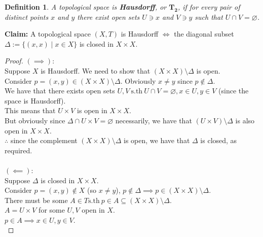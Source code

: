\documentclass{article}
\newcommand{\sth}{\mathrm{s.th}\ }
\renewcommand{\emptyset}{\varnothing}
\newtheorem{definition}[theorem]{Definition}
\theoremstyle{remark}
\begin{document}
\begin{enumerate}
          \begin{framed}
              \setcounter{section}{2}
              \begin{definition}
                  A topological space is \textbf{Hausdorff}, or $\mathbf{T_2}$,
                  if for every pair of distinct points $x$ and $y$ there exist
                  open sets $U \ni x$ and $V \ni y$ such that
                  $U \cap V = \emptyset$.
              \end{definition}
          \end{framed}
          \textbf{Claim:} A topological space $(X, T)$
          is Hausdorff $\iff$ the diagonal subset
          $\Delta := \{(x, x)\mid x \in X\}$ is closed in $X \times X$.
          \begin{proof}
              $(\implies)$:\\
              Suppose $X$ is Hausdorff.
              We need to show that $(X \times X) \setminus \Delta$ is open.\\
              Consider $p = (x,y) \in (X \times X) \setminus \Delta$.
              Obviously $x \neq y$ since $p \notin \Delta$.\\
              We have that there exists open sets $U,V\ \sth U \cap V = \emptyset,
                  x \in U, y \in V$ (since the space is Hausdorff).\\
              This means that $U \times V$ is open in $X \times X$.\\
              But obviously since $\Delta \cap U \times V = \emptyset$ necessarily,
              we have that $(U \times V) \setminus \Delta$ is also open in $X \times X$.\\
              $\therefore$ since the complement $(X \times X) \setminus \Delta$ is open,
              we have that $\Delta$ is closed, as required.\\\\
              $(\impliedby)$:\\
              Suppose $\Delta$ is closed in $X \times X$.\\
              Consider $p=(x,y) \notin X$ (so $x \neq y$),
              $p \notin \Delta \implies p \in (X \times X) \setminus \Delta$.\\
              There must be some
              $A \in T \sth p \in A \subseteq (X  \times X) \setminus \Delta$.\\
              $A = U \times V$ for some $U,V$ open in $X$.\\
              $p \in A \implies x \in U, y \in V$.\\

\end{proof}
\end{enumerate}
\end{document}
